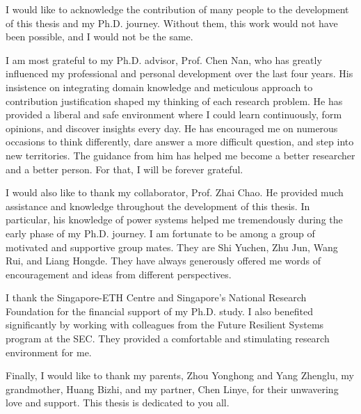 \begin{acknowledgments}

I would like to acknowledge the contribution of many people to the development of this thesis and my Ph.D. journey. Without them, this work would not have been possible, and I would not be the same. 

I am most grateful to my Ph.D. advisor, Prof. Chen Nan, who has greatly influenced my professional and personal development over the last four years. His insistence on integrating domain knowledge and meticulous approach to contribution justification shaped my thinking of each research problem. He has provided a liberal and safe environment where I could learn continuously, form opinions, and discover insights every day. He has encouraged me on numerous occasions to think differently, dare answer a more difficult question, and step into new territories. The guidance from him has helped me become a better researcher and a better person. For that, I will be forever grateful.  

I would also like to thank my collaborator, Prof. Zhai Chao. He provided much assistance and knowledge throughout the development of this thesis. In particular, his knowledge of power systems helped me tremendously during the early phase of my Ph.D. journey. I am fortunate to be among a group of motivated and supportive group mates. They are Shi Yuchen, Zhu Jun, Wang Rui, and Liang Hongde. They have always generously offered me words of encouragement and ideas from different perspectives. 

I thank the Singapore-ETH Centre and Singapore's National Research Foundation for the financial support of my Ph.D. study. I also benefited significantly by working with colleagues from the Future Resilient Systems program at the SEC. They provided a comfortable and stimulating research environment for me. 

Finally, I would like to thank my parents, Zhou Yonghong and Yang Zhenglu, my grandmother, Huang Bizhi, and my partner, Chen Linye, for their unwavering love and support. This thesis is dedicated to you all. 


\end{acknowledgments}
